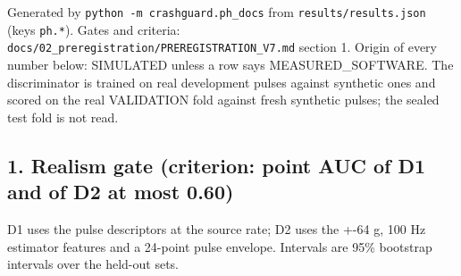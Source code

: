 


Generated by \texttt{python -m crashguard.ph\_docs} from \texttt{results/results.json} (keys \texttt{ph.*}). Gates and criteria: \texttt{docs/02\_preregistration/PREREGISTRATION\_V7.md} section 1. Origin of every number below: SIMULATED unless a row says MEASURED\_SOFTWARE. The discriminator is trained on real development pulses against synthetic ones and scored on the real VALIDATION fold against fresh synthetic pulses; the sealed test fold is not read.

\subsection*{1. Realism gate (criterion: point AUC of D1 and of D2 at most 0.60)}

D1 uses the pulse descriptors at the source rate; D2 uses the +-64 g, 100 Hz estimator features and a 24-point pulse envelope. Intervals are 95\% bootstrap intervals over the held-out sets.


